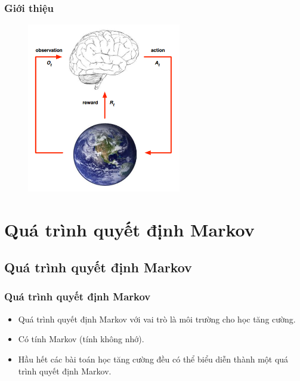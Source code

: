 \documentclass{beamer}
\begin{document}
\begin{frame}
\frametitle{Giới thiệu}
\begin{figure}[H]
  \begin{center}
    \includegraphics[width=0.6\textwidth]{s1.png}
  \end{center}
  \label{s1}
\end{figure}
\end{frame}

\section{Quá trình quyết định Markov}

\subsection{Quá trình quyết định Markov} %


\begin{frame}
\frametitle{Quá trình quyết định Markov}
\begin{itemize}
\item Quá trình quyết định Markov với vai trò là môi trường cho học tăng cường.
\item Có tính Markov (tính không nhớ).
\item Hầu hết các bài toán học tăng cường đều có thể biểu diễn thành một quá trình quyết định Markov.
\end{itemize}
\end{frame}
\end{document}
